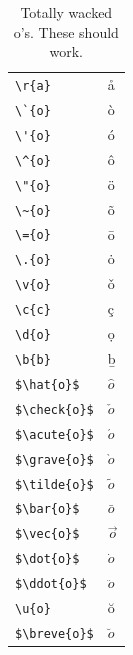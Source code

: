 ﻿\documentclass{article}
\begin{document}
\begin{table}
\begin{center}
\begin{tabular}{ll}
\verb#\r{a}#& \r{a}\\
\verb#\`{o}#& \`{o}\\
\verb#\'{o}#& \'{o}\\
\verb#\^{o}#& \^{o}\\
\verb#\"{o}#& \"{o}\\
\verb#\~{o}#& \~{o}\\
\verb#\={o}#& \={o}\\
\verb#\.{o}#& \.{o}\\
\verb#\v{o}#& \v{o}\\
\verb#\c{c}#& \c{c}\\
\verb#\d{o}#& \d{o}\\
\verb#\b{b}#& \b{b}\\
\verb#$\hat{o}$#& $\hat{o}$\\
\verb#$\check{o}$#& $\check{o}$\\
\verb#$\acute{o}$#& $\acute{o}$\\
\verb#$\grave{o}$#& $\grave{o}$\\
\verb#$\tilde{o}$#& $\tilde{o}$\\
\verb#$\bar{o}$#& $\bar{o}$\\
\verb#$\vec{o}$#& $\vec{o}$\\
\verb#$\dot{o}$#& $\dot{o}$\\
\verb#$\ddot{o}$#& $\ddot{o}$\\
\verb#\u{o}#& \u{o}\\
\verb#$\breve{o}$#& $\breve{o}$
\end{tabular}
\caption{Totally wacked o's.  These should work.}
\end{center}
\end{table}
\pagebreak
\end{document}
